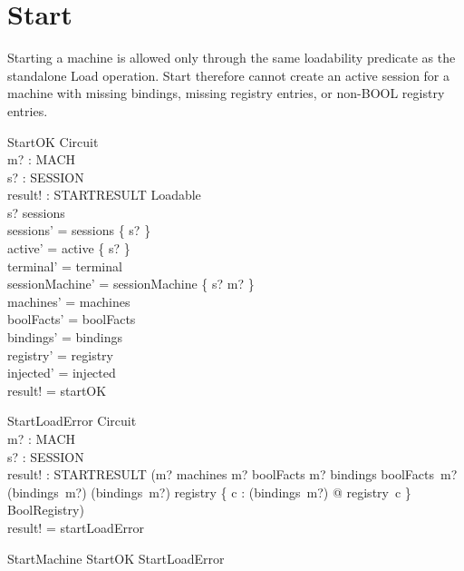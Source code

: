 \documentclass[a4paper,10pt,fleqn]{article}
\begin{document}
\section{Start}

Starting a machine is allowed only through the same loadability predicate as the
standalone Load operation. Start therefore cannot create an active session for a
machine with missing bindings, missing registry entries, or non-BOOL registry
entries.

\begin{schema}{StartOK}
  \Delta Circuit \\
  m? : MACH \\
  s? : SESSION \\
  result! : STARTRESULT
\where
  Loadable \\
  s? \notin sessions \\
  sessions' = sessions \cup \{ s? \} \\
  active' = active \cup \{ s? \} \\
  terminal' = terminal \\
  sessionMachine' = sessionMachine \cup \{ s? \mapsto m? \} \\
  machines' = machines \\
  boolFacts' = boolFacts \\
  bindings' = bindings \\
  registry' = registry \\
  injected' = injected \\
  result! = startOK
\end{schema}

\begin{schema}{StartLoadError}
  \Xi Circuit \\
  m? : MACH \\
  s? : SESSION \\
  result! : STARTRESULT
\where
  \lnot (m? \in machines \land m? \in \dom boolFacts \land m? \in \dom bindings
    \land boolFacts~m? \subseteq \dom (bindings~m?)
    \land \ran (bindings~m?) \subseteq \dom registry
    \land \{ c : \ran (bindings~m?) @ registry~c \} \subseteq BoolRegistry) \\
  result! = startLoadError
\end{schema}

\begin{zed}
  StartMachine  StartOK \lor StartLoadError
\end{zed}
\end{document}
